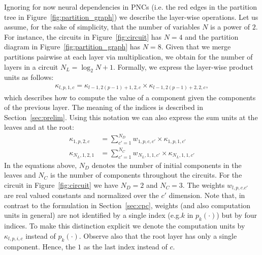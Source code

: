 \documentclass[letterpaper]{article} %
\newcommand{\eg}{e.g.\xspace}
\newcommand{\ie}{i.e.\xspace}
\newcommand{\circuit}{\ensuremath{p}}
\newcommand{\weight}{\ensuremath{w}}
\newcommand{\component}{\ensuremath{{\kappa}}}
\begin{document}
Ignoring for now neural dependencies in PNCs (\ie the red edges in the partition tree in Figure~\ref{fig:partition_graph}) we describe the layer-wise operations. Let us assume, for the sake of simplicity, that the number of variables $N$ is a power of $2$. For instance, the circuits in Figure~\ref{fig:circuit} has $N=4$ and the partition diagram in Figure~\ref{fig:partition_graph} has $N=8$. Given that we merge partitions pairwise at each layer via multiplication, we obtain for the number of layers in a circuit $N_L= \log_2 N+1$. Formally, we express the layer-wise product units as follows:
\begin{align}
	\component_{l,p,1,c} = \component_{l-1,2(p-1)+1,2,c} \times \component_{l-1,2(p-1)+2,2,c},
	\tag{ProductLayer}
\end{align}
which describes how to compute the value of a component given the components of the previous layer.
The meaning of the indices is described in Section~\ref{sec:prelim}. Using this notation we can also express the sum units at the leaves and at the root:
\begin{align}
	\component_{1,p,2,c}
	 & =
	\sum_{c'=1}^{N_D} \weight_{1,p,c,c'} \times \component_{1,p,1,c'}
	\tag{SumLeaf}
	\\
	\component_{N_L,1,2,1}
	 & =
	\sum_{c'=1}^{N_C} \weight_{N_L,1,1,c'} \times \component_{N_L,1,1,c'}
	\tag{SumRoot}
\end{align}
In the equations above, $N_D$ denotes the number of initial components in the leaves and $N_C$ is the number of components throughout the circuits.
For the circuit in Figure~\ref{fig:circuit} we have $N_D{=}2$ and $N_C{=}3$.
The weights $w_{l,p,c.c'}$ are real valued constants and normalized over the $c'$ dimension. Note that, in contrast to the formulation in Section~\ref{sec:cpc},
weights (and also computation units in general) are not identified by a single index (\eg $k$ in $\circuit_k(\cdot)$) but by four indices.
To make this distinction explicit we denote the computation units by $\kappa_{l,p,i,c}$ instead of $p_k(\cdot)$.
Observe also that the root layer has only a single component. Hence, the $1$ as the last index instead of $c$.
\end{document}
